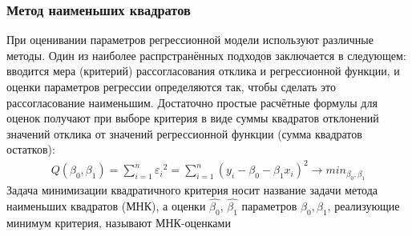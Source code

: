         \subsubsection{ Метод наименьших квадратов}
        При оценивании параметров регрессионной модели используют различные методы. Один из наиболее распрстранённых подходов заключается в следующем: вводится мера (критерий) рассогласования отклика и регрессионной функции, и оценки параметров регрессии определяются так, чтобы сделать это рассогласование наименьшим. Достаточно простые расчётные формулы для оценок получают при выборе критерия в виде суммы квадратов отклонений значений отклика от значений регрессионной функции (сумма квадратов остатков):
        \begin{gather}
            Q(\beta_0, \beta_1) = \sum_{i=1}^{n}{{\varepsilon_i}^2} = \sum_{i=1}^{n}{(y_i - \beta_0 - \beta_1x_i)^2} \rightarrow min_{\beta_0, \beta_1}
        \end{gather}
        Задача минимизации квадратичного критерия носит название задачи метода наименьших квадратов (МНК), а оценки $\hat{\beta_0}$, $\hat{\beta_1}$ параметров $\beta_0, \beta_1$, реализующие минимум критерия, называют МНК-оценками
